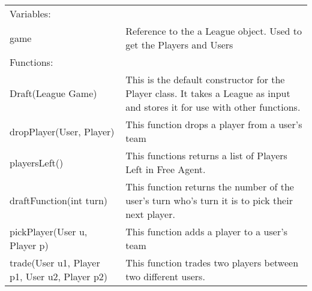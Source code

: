 \documentclass[12pt]{report}
\begin{document}
\begin{tabular}{ l p{5cm} }
Variables: & \\
game & Reference to the a League object. Used to get the Players and Users \\
Functions: & \\
Draft(League Game) & This is the default constructor for the Player class. It takes a League as input and stores it for use with other functions. \\
dropPlayer(User, Player) & This function drops a player from a user's team \\
playersLeft() & This functions returns a list of Players Left in Free Agent. \\
draftFunction(int turn) & This function returns the number of the user's turn who's turn it is to pick their next player. \\
pickPlayer(User u, Player p) & This function adds a player to a user's team 
\\
trade(User u1, Player p1, User u2, Player p2) & This function trades two players between two different users.
\end{tabular}
\end{document}
